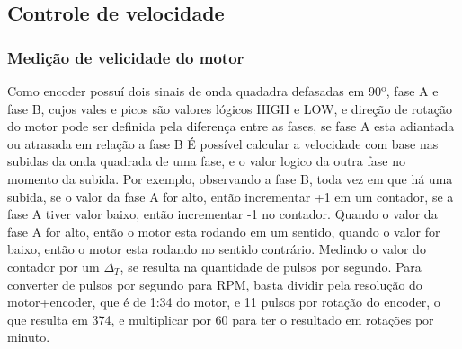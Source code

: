 \subsection{Controle de velocidade}

\subsubsection{Medição de velicidade do motor}

Como encoder possuí dois sinais de onda quadadra defasadas em 90º, fase A e fase B, cujos vales e picos são valores lógicos HIGH e LOW, 
e direção de rotação do motor pode ser definida pela diferença entre as fases, se fase A esta adiantada ou atrasada em relação a fase B
É possível calcular a velocidade com base nas subidas da onda quadrada de uma fase, e o valor logico da outra fase no momento da subida.
Por exemplo,  observando a fase B, toda vez em que há uma subida, se o valor da fase A for alto, então incrementar +1 em um contador, se a fase A tiver valor baixo, então incrementar -1 no contador.
Quando o valor da fase A for alto, então o motor esta rodando em um sentido,  quando o valor  for baixo, então o motor esta rodando no sentido contrário.
Medindo o valor do contador por um $\Delta_{T}$, se resulta na quantidade de pulsos por segundo.
Para converter de pulsos por segundo para RPM, basta dividir pela resolução do motor+encoder,  que é de 1:34 do motor, e 11 pulsos por rotação do encoder, o que resulta em 374,
e multiplicar por 60 para ter o resultado em rotações por minuto.




